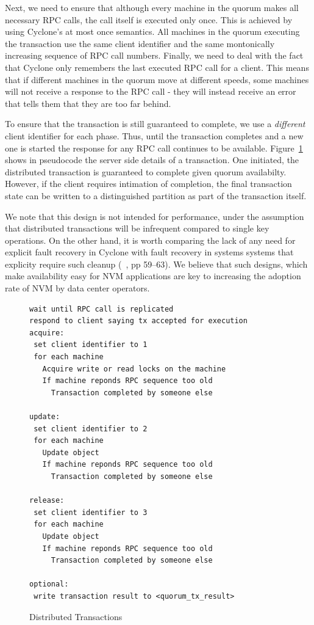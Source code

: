 \documentclass[letterpaper,twocolumn,10pt]{article}
\begin{document}
Next, we need to ensure that although every machine in the quorum makes all
necessary RPC calls, the call itself is executed only once. This is achieved by
using Cyclone's at most once semantics. All machines in the quorum executing the
transaction use the same client identifier and the same montonically increasing
sequence of RPC call numbers. Finally, we need to deal with the fact that
Cyclone only remembers the last executed RPC call for a client. This means that
if different machines in the quorum move at different speeds, some machines will
not receive a response to the RPC call - they will instead receive an error that
tells them that they are too far behind.

To ensure that the transaction is still guaranteed to complete, we use a
\emph{different} client identifier for each phase. Thus, until the transaction
completes and a new one is started the response for any RPC call continues to be
available. Figure~\ref{fig:dist_tx} shows in pseudocode the server side details
of a transaction. One initiated, the distributed transaction is guaranteed to
complete given quorum availabilty. However, if the client requires intimation of
completion, the final transaction state can be written to a distinguished
partition as part of the transaction itself.

We note that this design is not intended for performance, under the assumption
that distributed transactions will be infrequent compared to single key
operations.  On the other hand, it is worth comparing the lack of any need for
explicit fault recovery in Cyclone with fault recovery in systems systems that
explicity require such cleanup (~\cite{farm}, pp 59--63).  We believe that
such designs, which make availability easy for NVM applications are key to
increasing the adoption rate of NVM by data center operators.

\begin{figure}
{ \scriptsize
\begin{verbatim}
wait until RPC call is replicated
respond to client saying tx accepted for execution
acquire:
 set client identifier to 1
 for each machine
   Acquire write or read locks on the machine
   If machine reponds RPC sequence too old
     Transaction completed by someone else

update:
 set client identifier to 2
 for each machine
   Update object
   If machine reponds RPC sequence too old
     Transaction completed by someone else
 
release:
 set client identifier to 3
 for each machine
   Update object
   If machine reponds RPC sequence too old
     Transaction completed by someone else

optional:
 write transaction result to <quorum_tx_result>
\end{verbatim}
}
\caption{Distributed Transactions}
\label{fig:dist_tx}
\end{figure}
\end{document}
